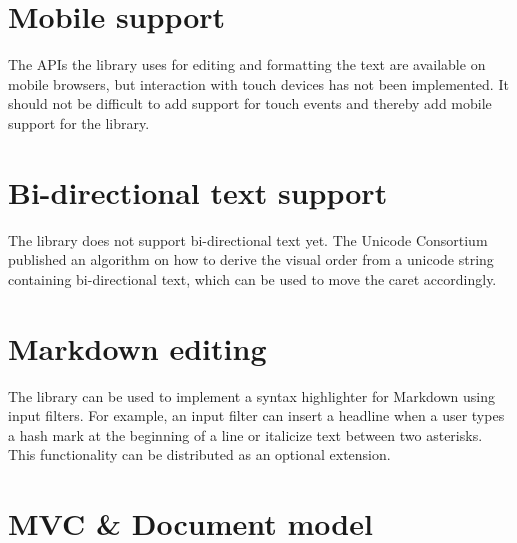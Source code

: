 

\section{Mobile support}

The APIs the library uses for editing and formatting the text are available on mobile browsers, but interaction with touch devices has not been implemented. It should not be difficult to add support for touch events and thereby add mobile support for the library.

\section{Bi-directional text support}

The library does not support bi-directional text yet. The Unicode Consortium published an algorithm \cite{UBA} on how to derive the visual order from a unicode string containing bi-directional text, which can be used to move the caret accordingly.

\section{Markdown editing}

The library can be used to implement a syntax highlighter for Markdown using input filters. For example, an input filter can insert a headline when a user types a hash mark at the beginning of a line or italicize text between two asterisks. This functionality can be distributed as an optional extension.

\section{MVC \& Document model}

